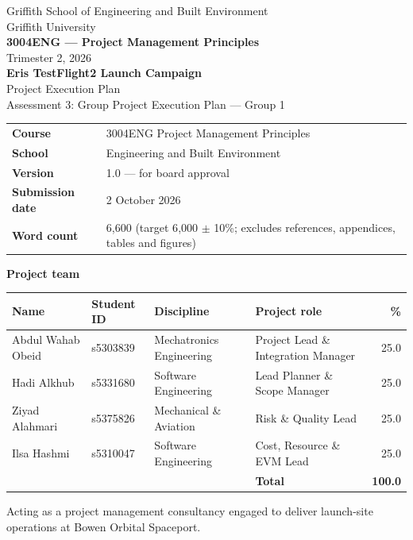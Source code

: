 \documentclass[12pt,a4paper]{article}
\numberwithin{table}{section}
\numberwithin{figure}{section}
\begin{document}
\begin{titlepage}
\thispagestyle{empty}
\hypersetup{pageanchor=false}
\centering
\singlespacing
{\large Griffith School of Engineering and Built Environment}\\[0.25em]
{\large Griffith University}\\[1.2em]
{\LARGE\bfseries 3004ENG --- Project Management Principles}\\[0.5em]
{\Large Trimester 2, 2026}\\[1.1em]
{\LARGE\bfseries Eris TestFlight2 Launch Campaign}\\[0.35em]
{\Large Project Execution Plan}\\[0.7em]
{\large Assessment 3: Group Project Execution Plan --- Group 1}\\[1.1em]

\begin{tabular}{@{}l p{11.2cm}@{}}
\textbf{Course} & 3004ENG Project Management Principles \\
\textbf{School} & Engineering and Built Environment \\
\textbf{Version} & 1.0 --- for board approval \\
\textbf{Submission date} & 2 October 2026 \\
\textbf{Word count} & 6{,}600 (target 6{,}000 $\pm$ 10\%; excludes references, appendices, tables and figures) \\
\end{tabular}

\vspace{1.2em}

{\large\bfseries Project team}\\[0.5em]
\renewcommand{\arraystretch}{1.3}
\small
\begin{tabularx}{\textwidth}{@{}l l l >{\raggedright\arraybackslash}X r@{}}
\toprule
\textbf{Name} & \textbf{Student ID} & \textbf{Discipline} & \textbf{Project role} & \textbf{\%} \\
\midrule
Abdul Wahab Obeid & s5303839 & Mechatronics Engineering & Project Lead \& Integration Manager & 25.0 \\
Hadi Alkhub       & s5331680 & Software Engineering     & Lead Planner \& Scope Manager & 25.0 \\
Ziyad Alahmari    & s5375826 & Mechanical \& Aviation   & Risk \& Quality Lead & 25.0 \\
Ilsa Hashmi       & s5310047 & Software Engineering     & Cost, Resource \& EVM Lead & 25.0 \\
\midrule
 &  &  & \textbf{Total} & \textbf{100.0} \\
\bottomrule
\end{tabularx}

\vfill
{\small Acting as a project management consultancy engaged to deliver launch-site operations at Bowen Orbital Spaceport.}
\par
\end{titlepage}
\end{document}
